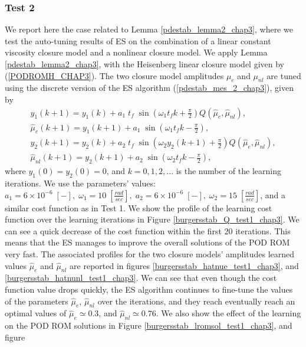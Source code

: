 \documentclass[letterpaper,conference,onecolumn,11pt]{IEEEtran}
\begin{document}
\subsubsection{Test 2} We report here the case related to Lemma
\ref{pdestab_lemma2_chap3}, where we test the auto-tuning results
of ES on the combination of a linear constant viscosity closure
model and a nonlinear closure model. We apply Lemma
\ref{pdestab_lemma2_chap3}, with the Heisenberg linear closure
model given by (\ref{PODROMH_CHAP3}). The two closure model
amplitudes $\mu_{e}$ and $\mu_{nl}$ are tuned using the discrete
version of the ES algorithm (\ref{pdestab_mes_2_chap3}), given by
\begin{equation}
\begin{array}{l}
y_{1}(k+1)=y_{1}(k)+a_{1}\;t_{f}\;\sin(\omega_{1} t_{f}k+\frac{\pi}{2})Q(\hat\mu_{e},{\hat\mu}_{nl}),\\
\hat{\mu}_{e}(k+1)=y_{1}(k+1)+a_{1}\;\sin(\omega_{1} t_{f}k-\frac{\pi}{2}),\\
y_{2}(k+1)=y_{2}(k)+a_{2}\;t_{f}\;\sin(\omega_{2} y_{2}(k+1)+\frac{\pi}{2})Q(\hat\mu_{e},{\hat\mu}_{nl}),\\
\hat{\mu}_{nl}(k+1)=y_{2}(k+1)+a_{2}\;\sin(\omega_{2}
t_{f}k-\frac{\pi}{2}), \label{pdestab_mes_2discrt_chap3}
\end{array}
\end{equation}
where $y_{1}(0)=y_{2}(0)=0$, and $k=0,1,2,...$ is the number of
the learning iterations. We use the parameters' values:
$a_{1}=6\times 10^{-6}\;[-],\;\omega_{1}=10\;
[\frac{rad}{sec}],\;a_{2}=6\times
10^{-6}\;[-],\;\omega_{2}=15\;[\frac{rad}{sec}]$, and a similar
cost function as in Test 1. We show the profile of the learning
cost function over the learning iterations in Figure
\ref{burgersstab_Q_test1_chap3}. We can see a quick decrease of
the cost function within the first $20$ iterations. This means
that the ES manages to improve the overall solutions of the POD
ROM very fast. The associated profiles for the two closure models'
amplitudes learned values $\hat{\mu}_{e}$ and $\hat{\mu}_{nl}$ are
reported in figures \ref{burgersstab_hatnue_test1_chap3}, and
\ref{burgersstab_hatnunl_test1_chap3}. We can see that even though
the cost function value drops quickly, the ES algorithm continues
to fine-tune the values of the parameters $\hat{\mu}_{e}$,
$\hat{\mu}_{nl}$ over the iterations, and they reach eventually
reach an optimal values of $\hat{\mu}_{e}\simeq 0.3$, and
$\hat{\mu}_{nl}\simeq 0.76$. We also show the effect of the
learning on the POD ROM solutions in Figure
\ref{burgersstab_lromsol_test1_chap3}, and figure
\end{document}
